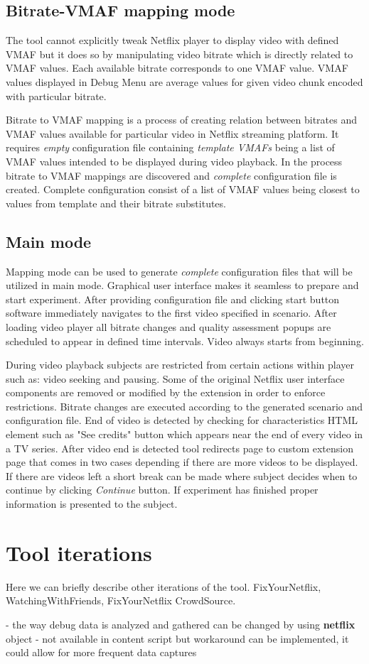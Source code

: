     \subsection{Bitrate-VMAF mapping mode}
        The tool cannot explicitly tweak Netflix player to display video with defined VMAF but it does so by manipulating video bitrate which is directly related to VMAF values. Each available bitrate corresponds to one VMAF value. VMAF values displayed in Debug Menu are average values for given video chunk encoded with particular bitrate.
    
        Bitrate to VMAF mapping is a process of creating relation between bitrates and VMAF values available for particular video in Netflix streaming platform. It requires \textit{empty} configuration file containing \textit{template VMAFs} being a list of VMAF values intended to be displayed during video playback. In the process bitrate to VMAF mappings are discovered and \textit{complete} configuration file is created. Complete configuration consist of a list of VMAF values being closest to values from template and their bitrate substitutes.

            
    \subsection{Main mode}
        Mapping mode can be used to generate \textit{complete} configuration files that will be utilized in main mode. Graphical user interface makes it seamless to prepare and start experiment. After providing configuration file and clicking start button software immediately navigates to the first video specified in scenario. After loading video player all bitrate changes and quality assessment popups are scheduled to appear in defined time intervals. Video always starts from beginning. 
    
        During video playback subjects are restricted from certain actions within player such as: video seeking and pausing. Some of the original Netflix user interface components are removed or modified by the extension in order to enforce restrictions.
        Bitrate changes are executed according to the generated scenario and configuration file. End of video is detected by checking for characteristics HTML element such as "See credits" button which appears near the end of every video in a TV series. After video end is detected tool redirects page to custom extension page that comes in two cases depending if there are more videos to be displayed. If there are videos left a short break can be made where subject decides when to continue by clicking \textit{Continue} button. If experiment has finished proper information is presented to the subject.

    \section{Tool iterations}
    Here we can briefly describe other iterations of the tool. FixYourNetflix, WatchingWithFriends, FixYourNetflix CrowdSource.
    
    - the way debug data is analyzed and gathered can be changed by using \textbf{netflix} object - not available in content script but workaround can be implemented, it could allow for more frequent data captures